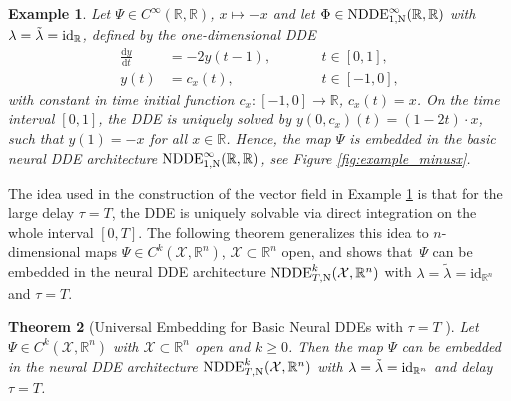 \documentclass[10pt]{article}
\numberwithin{equation}{section}
\newcommand*{\dd}{\mathrm{d}}
\newtheorem{theorem}{Theorem}[section]
\newtheorem{example}[theorem]{Example}
\begin{document}
	\begin{example} \label{ex:minusxembedding_b}
		\normalfont
		Let $\Psi\in C^\infty(\mathbb{R},\mathbb{R})$, $x \mapsto -x$ and let $\Phi \in \textup{NDDE}_{1,\textup{N}}^\infty(\mathbb{R},\mathbb{R})$ with  $\lambda = \tilde\lambda = \textup{id}_\mathbb{R}$, defined by the one-dimensional DDE
		\begin{equation*}
			\begin{aligned}
				\frac{\dd y}{\dd t} &= -2y(t-1), \qquad&& t \in [0,1], \\
				y(t) &= c_x(t), &&t \in [-1,0],
			\end{aligned}
		\end{equation*}
		with constant in time initial function $c_x:[-1,0]\rightarrow \mathbb{R}$, $c_x(t) = x$. On the time interval $[0,1]$, the DDE is uniquely solved by $y(0,c_x)(t) = (1-2t)\cdot x$, such that $y(1) = -x$ for all $x \in \mathbb{R}$. Hence, the map $\Psi$ is embedded in the basic neural DDE architecture $\textup{NDDE}_{1,\textup{N}}^\infty(\mathbb{R},\mathbb{R})$, see Figure \ref{fig:example_minusx}.
	\end{example}
	
	The idea used in the construction of the vector field in Example \ref{ex:minusxembedding_b} is that for the large delay $\tau = T$, the  DDE is uniquely solvable via direct integration on the whole interval $[0,T]$. The following theorem generalizes this idea to $n$-dimensional  maps $\Psi\in C^k(\mathcal{X}, \mathbb{R}^n)$, $\mathcal{X} \subset \mathbb{R}^n$ open, and shows that~$\Psi$ can be embedded in the neural DDE architecture $\textup{NDDE}_{T,\textup{N}}^k(\mathcal{X},\mathbb{R}^n)$ with $\lambda = \tilde\lambda = \text{id}_{\mathbb{R}^n}$ and $\tau = T$.
	
	\begin{theorem}[Universal Embedding for Basic Neural DDEs with $\tau = T$ \cite{Zhu2021}] \label{th:universal_zhu}
		Let $\Psi\in C^k(\mathcal{X}, \mathbb{R}^n)$ with $\mathcal{X} \subset \mathbb{R}^n$ open and $k \geq 0$. Then the map $\Psi$ can be embedded in the  neural DDE architecture $\textup{NDDE}_{T,\textup{N}}^k(\mathcal{X},\mathbb{R}^n)$ with $\lambda = \tilde\lambda = \textup{id}_{\mathbb{R}^n}$ and delay $\tau = T$.
	\end{theorem}
	
\end{document}
